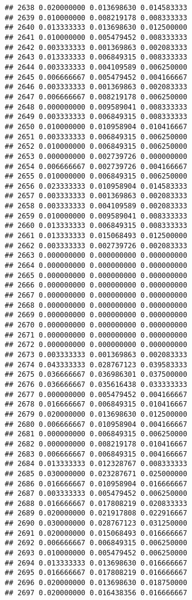 \documentclass[
]{article}
\begin{document}
\begin{verbatim}
## 2638 0.020000000 0.013698630 0.014583333
## 2639 0.010000000 0.008219178 0.008333333
## 2640 0.013333333 0.013698630 0.012500000
## 2641 0.010000000 0.005479452 0.008333333
## 2642 0.003333333 0.001369863 0.002083333
## 2643 0.013333333 0.006849315 0.008333333
## 2644 0.003333333 0.004109589 0.006250000
## 2645 0.006666667 0.005479452 0.004166667
## 2646 0.003333333 0.001369863 0.002083333
## 2647 0.006666667 0.008219178 0.006250000
## 2648 0.000000000 0.009589041 0.008333333
## 2649 0.003333333 0.006849315 0.008333333
## 2650 0.010000000 0.010958904 0.010416667
## 2651 0.003333333 0.006849315 0.006250000
## 2652 0.010000000 0.006849315 0.006250000
## 2653 0.000000000 0.002739726 0.000000000
## 2654 0.006666667 0.002739726 0.004166667
## 2655 0.010000000 0.006849315 0.006250000
## 2656 0.023333333 0.010958904 0.014583333
## 2657 0.003333333 0.001369863 0.002083333
## 2658 0.003333333 0.004109589 0.002083333
## 2659 0.010000000 0.009589041 0.008333333
## 2660 0.013333333 0.006849315 0.008333333
## 2661 0.013333333 0.015068493 0.012500000
## 2662 0.003333333 0.002739726 0.002083333
## 2663 0.000000000 0.000000000 0.000000000
## 2664 0.000000000 0.000000000 0.000000000
## 2665 0.000000000 0.000000000 0.000000000
## 2666 0.000000000 0.000000000 0.000000000
## 2667 0.000000000 0.000000000 0.000000000
## 2668 0.000000000 0.000000000 0.000000000
## 2669 0.000000000 0.000000000 0.000000000
## 2670 0.000000000 0.000000000 0.000000000
## 2671 0.000000000 0.000000000 0.000000000
## 2672 0.000000000 0.000000000 0.000000000
## 2673 0.003333333 0.001369863 0.002083333
## 2674 0.043333333 0.028767123 0.039583333
## 2675 0.036666667 0.036986301 0.037500000
## 2676 0.036666667 0.035616438 0.033333333
## 2677 0.000000000 0.005479452 0.004166667
## 2678 0.016666667 0.006849315 0.010416667
## 2679 0.020000000 0.013698630 0.012500000
## 2680 0.006666667 0.010958904 0.004166667
## 2681 0.000000000 0.006849315 0.006250000
## 2682 0.000000000 0.008219178 0.010416667
## 2683 0.006666667 0.006849315 0.004166667
## 2684 0.013333333 0.012328767 0.008333333
## 2685 0.030000000 0.023287671 0.025000000
## 2686 0.016666667 0.010958904 0.016666667
## 2687 0.003333333 0.005479452 0.006250000
## 2688 0.016666667 0.017808219 0.020833333
## 2689 0.020000000 0.021917808 0.022916667
## 2690 0.030000000 0.028767123 0.031250000
## 2691 0.020000000 0.015068493 0.016666667
## 2692 0.006666667 0.006849315 0.006250000
## 2693 0.010000000 0.005479452 0.006250000
## 2694 0.013333333 0.013698630 0.016666667
## 2695 0.016666667 0.017808219 0.016666667
## 2696 0.020000000 0.013698630 0.018750000
## 2697 0.020000000 0.016438356 0.016666667

\end{verbatim}
\end{document}

